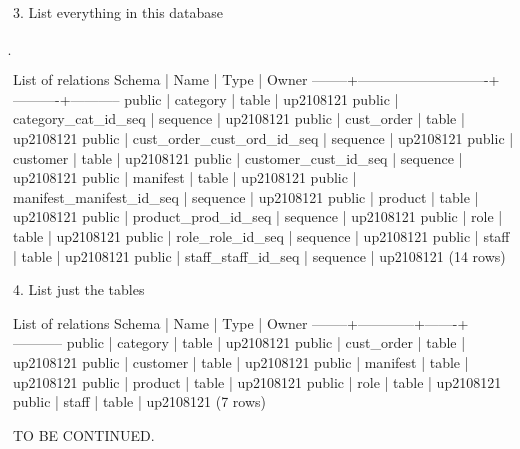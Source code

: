 3. List everything in this database
\begin{sql}
\d
\end{sql}
\begin{pseudo*}
                    List of relations
Schema |            Name            |   Type   |   Owner   
--------+----------------------------+----------+-----------
public | category                   | table    | up2108121
public | category_cat_id_seq        | sequence | up2108121
public | cust_order                 | table    | up2108121
public | cust_order_cust_ord_id_seq | sequence | up2108121
public | customer                   | table    | up2108121
public | customer_cust_id_seq       | sequence | up2108121
public | manifest                   | table    | up2108121
public | manifest_manifest_id_seq   | sequence | up2108121
public | product                    | table    | up2108121
public | product_prod_id_seq        | sequence | up2108121
public | role                       | table    | up2108121
public | role_role_id_seq           | sequence | up2108121
public | staff                      | table    | up2108121
public | staff_staff_id_seq         | sequence | up2108121
(14 rows)
\end{pseudo*}

4. List just the tables
\begin{sql}
\dt
\end{sql}
\begin{pseudo*}
           List of relations
Schema |    Name    | Type  |   Owner   
--------+------------+-------+-----------
public | category   | table | up2108121
public | cust_order | table | up2108121
public | customer   | table | up2108121
public | manifest   | table | up2108121
public | product    | table | up2108121
public | role       | table | up2108121
public | staff      | table | up2108121
(7 rows)
\end{pseudo*}

TO BE CONTINUED.
